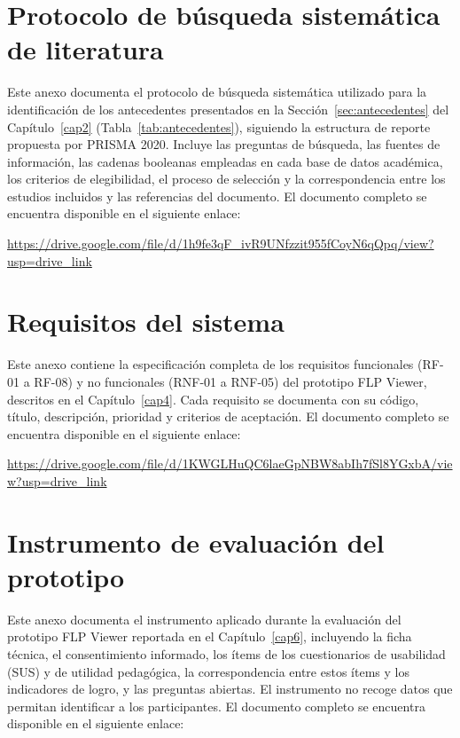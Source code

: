 \chapter{Protocolo de búsqueda sistemática de literatura}
\label{annex:slr}

Este anexo documenta el protocolo de búsqueda sistemática utilizado para la identificación de los antecedentes presentados en la Sección~\ref{sec:antecedentes} del Capítulo~\ref{cap2} (Tabla~\ref{tab:antecedentes}), siguiendo la estructura de reporte propuesta por PRISMA 2020. Incluye las preguntas de búsqueda, las fuentes de información, las cadenas booleanas empleadas en cada base de datos académica, los criterios de elegibilidad, el proceso de selección y la correspondencia entre los estudios incluidos y las referencias del documento. El documento completo se encuentra disponible en el siguiente enlace:

\noindent\url{https://drive.google.com/file/d/1h9fe3qF_ivR9UNfzzit955fCoyN6qQpq/view?usp=drive_link}

\chapter{Requisitos del sistema}
\label{annex:rf}

Este anexo contiene la especificación completa de los requisitos funcionales (RF-01 a RF-08) y no funcionales (RNF-01 a RNF-05) del prototipo FLP Viewer, descritos en el Capítulo~\ref{cap4}. Cada requisito se documenta con su código, título, descripción, prioridad y criterios de aceptación. El documento completo se encuentra disponible en el siguiente enlace:

\noindent\url{https://drive.google.com/file/d/1KWGLHuQC6laeGpNBW8abIh7fSl8YGxbA/view?usp=drive_link}

\chapter{Instrumento de evaluación del prototipo}
\label{annex:eval-instrumento}
\label{annex:eval-consentimiento}

Este anexo documenta el instrumento aplicado durante la evaluación del prototipo FLP Viewer reportada en el Capítulo~\ref{cap6}, incluyendo la ficha técnica, el consentimiento informado, los ítems de los cuestionarios de usabilidad (SUS) y de utilidad pedagógica, la correspondencia entre estos ítems y los indicadores de logro, y las preguntas abiertas. El instrumento no recoge datos que permitan identificar a los participantes. El documento completo se encuentra disponible en el siguiente enlace:

